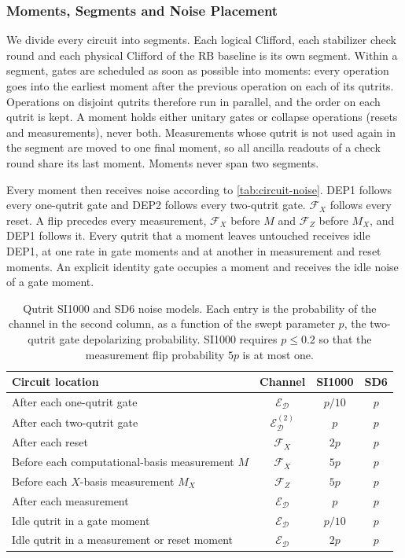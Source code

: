 \subsubsection{Moments, Segments and Noise Placement}

We divide every circuit into segments. Each logical Clifford, each stabilizer check round and each physical Clifford of the RB baseline is its own segment. Within a segment, gates are scheduled as soon as possible into moments: every operation goes into the earliest moment after the previous operation on each of its qutrits. Operations on disjoint qutrits therefore run in parallel, and the order on each qutrit is kept. A moment holds either unitary gates or collapse operations (resets and measurements), never both. Measurements whose qutrit is not used again in the segment are moved to one final moment, so all ancilla readouts of a check round share its last moment. Moments never span two segments.

Every moment then receives noise according to \autoref{tab:circuit-noise}. DEP1 follows every one-qutrit gate and DEP2 follows every two-qutrit gate. $\mathcal{F}_X$ follows every reset. A flip precedes every measurement, $\mathcal{F}_X$ before $M$ and $\mathcal{F}_Z$ before $M_X$, and DEP1 follows it. Every qutrit that a moment leaves untouched receives idle DEP1, at one rate in gate moments and at another in measurement and reset moments. An explicit identity gate occupies a moment and receives the idle noise of a gate moment.

\begin{table}[H]
  \centering
  \begin{tabular}{l|c|c|c}
    \hline
    Circuit location & Channel & SI1000 & SD6 \\
    \hline
    After each one-qutrit gate & $\mathcal{E}_{\mathcal{D}}$ & $p/10$ & $p$ \\
    After each two-qutrit gate & $\mathcal{E}^{(2)}_{\mathcal{D}}$ & $p$ & $p$ \\
    After each reset & $\mathcal{F}_X$ & $2p$ & $p$ \\
    Before each computational-basis measurement $M$ & $\mathcal{F}_X$ & $5p$ & $p$ \\
    Before each $X$-basis measurement $M_X$ & $\mathcal{F}_Z$ & $5p$ & $p$ \\
    After each measurement & $\mathcal{E}_{\mathcal{D}}$ & $p$ & $p$ \\
    Idle qutrit in a gate moment & $\mathcal{E}_{\mathcal{D}}$ & $p/10$ & $p$ \\
    Idle qutrit in a measurement or reset moment & $\mathcal{E}_{\mathcal{D}}$ & $2p$ & $p$ \\
    \hline
  \end{tabular}
  \caption{Qutrit SI1000 and SD6 noise models. Each entry is the probability of the channel in the second column, as a function of the swept parameter $p$, the two-qutrit gate depolarizing probability. SI1000 requires $p \le 0.2$ so that the measurement flip probability $5p$ is at most one.}
  \label{tab:circuit-noise}
\end{table}

